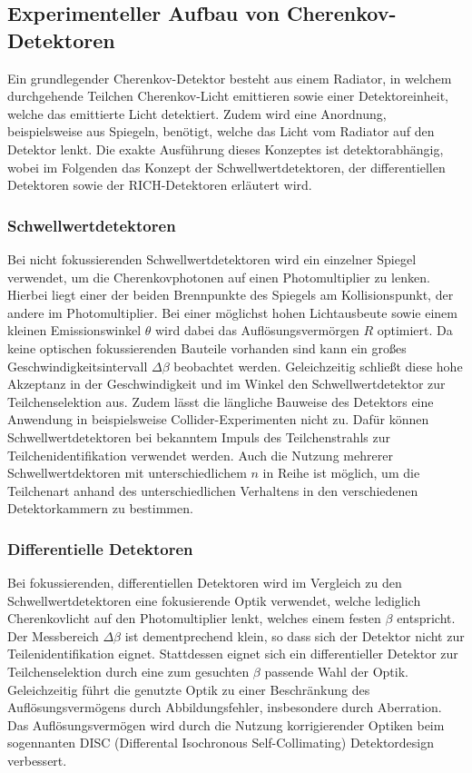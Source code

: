 \subsection{Experimenteller Aufbau von Cherenkov-Detektoren}
Ein grundlegender Cherenkov-Detektor besteht aus einem Radiator, in welchem durchgehende Teilchen Cherenkov-Licht emittieren sowie einer Detektoreinheit, welche das emittierte Licht detektiert. Zudem wird eine Anordnung, beispielsweise aus Spiegeln, benötigt, welche das Licht vom Radiator auf den Detektor lenkt.
Die exakte Ausführung dieses Konzeptes ist detektorabhängig, wobei im Folgenden das Konzept der Schwellwertdetektoren, der differentiellen Detektoren sowie der RICH-Detektoren erläutert wird.

\subsubsection{Schwellwertdetektoren}
Bei nicht fokussierenden Schwellwertdetektoren wird ein einzelner Spiegel verwendet, um die Cherenkovphotonen auf einen Photomultiplier zu lenken.
Hierbei liegt einer der beiden Brennpunkte des Spiegels am Kollisionspunkt, der andere im Photomultiplier.
Bei einer möglichst hohen Lichtausbeute sowie einem kleinen Emissionswinkel $\theta$ wird dabei das Auflösungsvermörgen $R$ optimiert.
Da keine optischen fokussierenden Bauteile vorhanden sind kann ein großes Geschwindigkeitsintervall $\Delta\beta$ beobachtet werden. 
Geleichzeitig schließt diese hohe Akzeptanz in der Geschwindigkeit und im Winkel den Schwellwertdetektor zur Teilchenselektion aus.
Zudem lässt die längliche Bauweise des Detektors eine Anwendung in beispielsweise Collider-Experimenten nicht zu.
Dafür können Schwellwertdetektoren bei bekanntem Impuls des Teilchenstrahls zur Teilchenidentifikation verwendet werden.
Auch die Nutzung mehrerer Schwellwertdektoren mit unterschiedlichem $n$ in Reihe ist möglich, um die Teilchenart anhand des unterschiedlichen Verhaltens in den verschiedenen Detektorkammern zu bestimmen.

\subsubsection{Differentielle Detektoren}
Bei fokussierenden, differentiellen Detektoren wird im Vergleich zu den Schwellwertdetektoren eine fokusierende Optik verwendet, welche lediglich Cherenkovlicht auf den Photomultiplier lenkt, welches einem festen $\beta$ entspricht.
Der Messbereich $\Delta \beta$ ist dementprechend klein, so dass sich der Detektor nicht zur Teilenidentifikation eignet.
Stattdessen eignet sich ein differentieller Detektor zur Teilchenselektion durch eine zum gesuchten $\beta$ passende Wahl der Optik.
Geleichzeitig führt die genutzte Optik zu einer Beschränkung des Auflösungsvermögens durch Abbildungsfehler, insbesondere durch Aberration.
Das Auflösungsvermögen wird durch die Nutzung korrigierender Optiken beim sogennanten DISC (Differental Isochronous Self-Collimating) Detektordesign verbessert.

